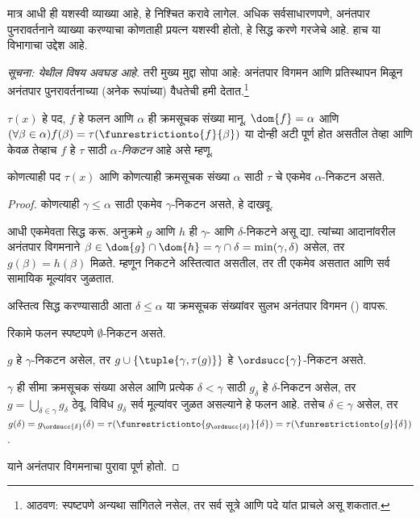 \documentclass[../../../include/open-logic-section]{subfiles}
\begin{document}

मात्र आधी  ही यशस्वी व्याख्या आहे, हे निश्चित करावे लागेल. अधिक सर्वसाधारणपणे, अनंतपार पुनरावर्तनाने व्याख्या करण्याचा कोणताही प्रयत्न यशस्वी होतो, हे सिद्ध करणे गरजेचे आहे. हाच या विभागाचा उद्देश आहे.

\emph{सूचना: येथील विषय अवघड आहे}. तरी मुख्य मुद्दा सोपा आहे: अनंतपार विगमन आणि प्रतिस्थापन मिळून अनंतपार पुनरावर्तनाच्या (अनेक रूपांच्या) वैधतेची हमी देतात.\footnote{आठवण: स्पष्टपणे अन्यथा सांगितले नसेल, तर सर्व सूत्रे आणि पदे यांत प्राचले असू शकतात.}

\begin{defn}
	$\tau(x)$ हे पद, $f$ हे फलन आणि $\alpha$ ही क्रमसूचक संख्या मानू. $\dom{f} = \alpha$ आणि $(\forall \beta \in \alpha)f(\beta) = \tau(\funrestrictionto{f}{\beta})$ या दोन्ही अटी पूर्ण होत असतील तेव्हा आणि केवळ तेव्हाच $f$ हे $\tau$ साठी \emph{$\alpha$-निकटन} आहे असे म्हणू.
\end{defn}

\begin{lem}[परिबद्ध पुनरावर्तन]
कोणत्याही पद $\tau(x)$ आणि कोणत्याही क्रमसूचक संख्या $\alpha$ साठी $\tau$ चे एकमेव $\alpha$-निकटन असते.
\end{lem}
\begin{proof}
कोणत्याही $\gamma \leq \alpha$ साठी एकमेव $\gamma$-निकटन असते, हे दाखवू.

आधी एकमेवता सिद्ध करू. अनुक्रमे $g$ आणि $h$ ही $\gamma$- आणि $\delta$-निकटने असू द्या. त्यांच्या आदानांवरील अनंतपार विगमनाने $\beta \in \dom{g} \cap \dom{h} =
\gamma \cap \delta = \min(\gamma, \delta)$ असेल, तर $g(\beta) = h(\beta)$ मिळते. म्हणून निकटने अस्तित्वात असतील, तर ती एकमेव असतात आणि सर्व सामायिक मूल्यांवर जुळतात.

अस्तित्व सिद्ध करण्यासाठी आता $\delta \leq \alpha$ या क्रमसूचक संख्यांवर सुलभ अनंतपार विगमन () वापरू.

रिकामे फलन स्पष्टपणे $\emptyset$-निकटन असते.

$g$ हे $\gamma$-निकटन असेल, तर $g \cup
\{\tuple{\gamma, \tau(g)}\}$ हे $\ordsucc{\gamma}$-निकटन असते.

$\gamma$ ही सीमा क्रमसूचक संख्या असेल आणि प्रत्येक $\delta < \gamma$ साठी $g_\delta$ हे $\delta$-निकटन असेल, तर $g = \bigcup_{\delta \in \gamma} g_\delta$ ठेवू. विविध $g_\delta$ सर्व मूल्यांवर जुळत असल्याने हे फलन आहे. तसेच $\delta \in \gamma$ असेल, तर $g(\delta) = g_{\ordsucc{\delta}}(\delta) =
\tau(\funrestrictionto{g_{\ordsucc{\delta}}}{\delta}) =
\tau(\funrestrictionto{g}{\delta})$.

याने अनंतपार विगमनाचा पुरावा पूर्ण होतो.
\end{proof}
\end{document}
